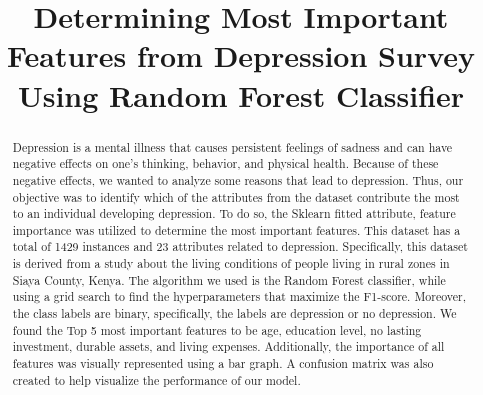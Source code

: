 \documentclass[conference]{IEEEtran}
\begin{document}
\title{Determining Most Important Features from Depression Survey Using Random Forest Classifier\\}

\author{
\and
{}

\and
{}
\and
{}

}

\maketitle

\begin{abstract}
Depression is a mental illness that causes persistent feelings of sadness and can have negative effects on one's thinking, behavior, and physical health. Because of these negative effects, we wanted to analyze some reasons that lead to depression. Thus, our objective was to identify which of the attributes from the dataset contribute the most to an individual developing depression. To do so, the Sklearn fitted attribute, feature importance was utilized to determine the most important features. This dataset has a total of 1429 instances and 23 attributes related to depression. Specifically, this dataset is derived from a study about the living conditions of people living in rural zones in Siaya County, Kenya. The algorithm we used is the Random Forest classifier, while using a grid search to find the hyperparameters that maximize the F1-score. Moreover, the class labels are binary, specifically, the labels are depression or no depression. We found the Top 5 most important features to be age, education level, no lasting investment, durable assets, and living expenses. Additionally, the importance of all features was visually represented using a bar graph. A confusion matrix was also created to help visualize the performance of our model.

\end{abstract}
\end{document}
